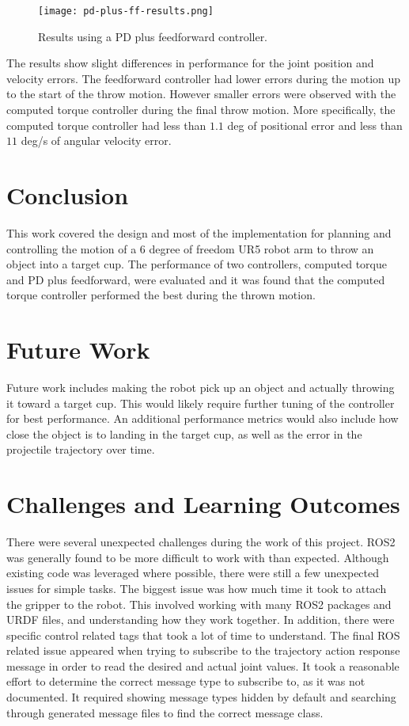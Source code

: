 \documentclass[conference]{IEEEtran}
\begin{document}
\begin{figure}[!t]
  \texttt{[image: pd-plus-ff-results.png]}
  \caption{Results using a PD plus feedforward controller.}
  \label{fig:pd-plus-ff-results}
\end{figure}

The results show slight differences in performance for the joint position and
velocity errors. The feedforward controller had lower errors during the motion
up to the start of the throw motion. However smaller errors were observed with
the computed torque controller during the final throw motion. More specifically,
the computed torque controller had less than $1.1$ deg of positional error and
less than $11$ deg/s of angular velocity error.

\section{Conclusion}
This work covered the design and most of the implementation for planning and
controlling the motion of a 6 degree of freedom UR5 robot arm to throw an object
into a target cup. The performance of two controllers, computed torque and PD
plus feedforward, were evaluated and it was found that the computed torque
controller performed the best during the thrown motion. 

\section{Future Work}
Future work includes making the robot pick up an object and actually throwing it
toward a target cup. This would likely require further tuning of the controller
for best performance. An additional performance metrics would also include how
close the object is to landing in the target cup, as well as the error in the
projectile trajectory over time.

\section{Challenges and Learning Outcomes}
There were several unexpected challenges during the work of this project. ROS2
was generally found to be more difficult to work with than expected. Although
existing code was leveraged where possible, there were still a few unexpected
issues for simple tasks. The biggest issue was how much time it took to attach
the gripper to the robot. This involved working with many ROS2 packages and URDF
files, and understanding how they work together. In addition, there were
specific control related tags that took a lot of time to understand. The final
ROS related issue appeared when trying to subscribe to the trajectory action
response message in order to read the desired and actual joint values. It took a
reasonable effort to determine the correct message type to subscribe to, as it
was not documented. It required showing message types hidden by default and
searching through generated message files to find the correct message class.
\end{document}
